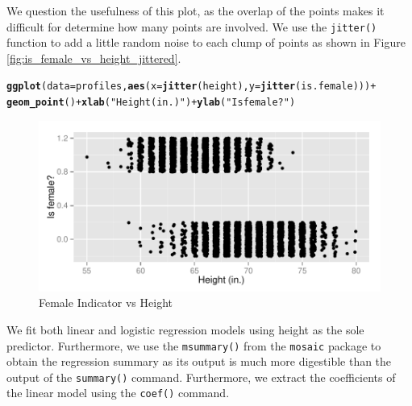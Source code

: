\documentclass{article}\usepackage[]{graphicx}\usepackage[]{color}
\makeatletter
\def\maxwidth{ %
  \ifdim\Gin@nat@width>\linewidth
    \linewidth
  \else
    \Gin@nat@width
  \fi
}
\newcommand{\hlstr}[1]{\textcolor[rgb]{0.192,0.494,0.8}{#1}}%
\newcommand{\hlopt}[1]{\textcolor[rgb]{0,0,0}{#1}}%
\newcommand{\hlstd}[1]{\textcolor[rgb]{0.345,0.345,0.345}{#1}}%
\newcommand{\hlkwc}[1]{\textcolor[rgb]{0.333,0.667,0.333}{#1}}%
\newcommand{\hlkwd}[1]{\textcolor[rgb]{0.737,0.353,0.396}{\textbf{#1}}}%
\newenvironment{kframe}{%
 \def\at@end@of@kframe{}%
 \ifinner\ifhmode%
  \def\at@end@of@kframe{\end{minipage}}%
  \begin{minipage}{\columnwidth}%
 \fi\fi%
 \def\FrameCommand##1{\hskip\@totalleftmargin \hskip-\fboxsep
 \colorbox{shadecolor}{##1}\hskip-\fboxsep
     \hskip-\linewidth \hskip-\@totalleftmargin \hskip\columnwidth}%
 \MakeFramed {\advance\hsize-\width
   \@totalleftmargin\z@ \linewidth\hsize
   \@setminipage}}%
 {\par\unskip\endMakeFramed%
 \at@end@of@kframe}
\newenvironment{knitrout}{}{} %
\makeatother
\begin{document}
We question the usefulness of this plot, as the overlap of the points makes it difficult for determine how many points are involved.  We use the \verb#jitter()# function to add a little random noise to each clump of points as shown in Figure \ref{fig:is_female_vs_height_jittered}.

\begin{knitrout}
\color{fgcolor}\begin{kframe}
\begin{alltt}
\hlkwd{ggplot}\hlstd{(}\hlkwc{data}\hlstd{=profiles,} \hlkwd{aes}\hlstd{(}\hlkwc{x}\hlstd{=}\hlkwd{jitter}\hlstd{(height),} \hlkwc{y}\hlstd{=}\hlkwd{jitter}\hlstd{(is.female)))} \hlopt{+}
  \hlkwd{geom_point}\hlstd{()} \hlopt{+} \hlkwd{xlab}\hlstd{(}\hlstr{"Height (in.)"}\hlstd{)} \hlopt{+} \hlkwd{ylab}\hlstd{(}\hlstr{"Is female?"}\hlstd{)}
\end{alltt}
\end{kframe}\begin{figure}

{\centering \includegraphics[width=\maxwidth]{figure/is_female_vs_height_jitered-1} 

}

\caption[Female Indicator vs Height]{Female Indicator vs Height}\label{fig:is_female_vs_height_jitered}
\end{figure}


\end{knitrout}

We fit both linear and logistic regression models using height as the sole predictor.  Furthermore, we use the \verb#msummary()# from the \verb#mosaic# package to obtain the regression summary as its output is much more digestible than the output of the \verb#summary()# command.  Furthermore, we extract the coefficients of the linear model using the \verb#coef()# command.
\end{document}
